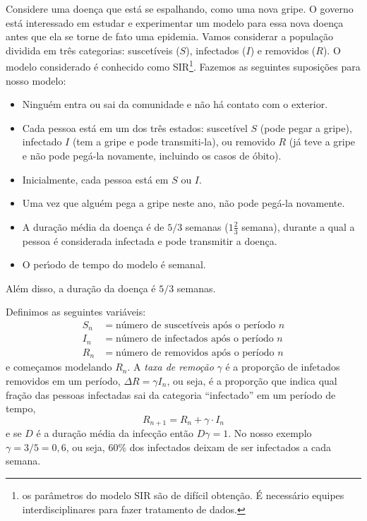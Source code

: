 \documentclass{article}
\begin{document}
Considere uma doen\c{c}a que est\'a se espalhando, como uma nova
gripe. O governo est\'a interessado em estudar e experimentar um modelo
para essa nova doen\c{c}a antes que ela se torne de fato uma
epidemia. Vamos considerar a popula\c{c}\~ao dividida em tr\^es
categorias: suscet\'iveis ($S$), infectados ($I$) e removidos ($R$).  O
modelo considerado \'{e} conhecido como SIR\footnote{os parâmetros do
  modelo SIR são de difícil obtenção. É necessário equipes
  interdisciplinares para fazer tratamento de dados.}. Fazemos as
seguintes suposi\c{c}\~oes para nosso modelo:
\begin{itemize}
\item Ningu\'em entra ou sai da comunidade e n\~ao h\'a contato com o
  exterior.
\item Cada pessoa est\'a em um dos tr\^es estados: suscet\'ivel $S$
  (pode pegar a gripe), infectado $I$ (tem a gripe e pode
  transmiti-la), ou removido $R$ (j\'a teve a gripe e n\~ao pode
  peg\'a-la novamente, incluindo os casos de \'obito).
\item Inicialmente, cada pessoa est\'a em $S$ ou $I$.
\item Uma vez que algu\'em pega a gripe neste ano, n\~ao pode peg\'a-la
  novamente.
\item A dura\c{c}\~ao m\'edia da doen\c{c}a \'e de $5/3$ semanas
  ($1\tfrac 23$ semana), durante a qual a pessoa \'{e}
  considerada infectada e pode transmitir a doen\c{c}a.
\item O per\'{\i}odo de tempo do modelo \'{e} semanal.
\end{itemize}
Além disso, a dura\c{c}\~ao da doen\c{c}a \'{e} $5/3$ semanas.

Definimos as seguintes vari\'{a}veis:
\begin{align*}
  S_n &= \text{n\'umero de suscet\'iveis ap\'os o per\'iodo } n \\
  I_n &= \text{n\'umero de infectados ap\'os o per\'iodo } n \\
  R_n &= \text{n\'umero de removidos ap\'os o per\'iodo } n
\end{align*}
e come\c{c}amos modelando $R_n$. A \emph{taxa de remoção} $\gamma$ é a
proporção de infetados removidos em um período,
$ \Delta R = \gamma I_n$, ou seja, é a proporção que indica qual fração
das pessoas infectadas sai da categoria ``infectado'' em um período de
tempo,
\[
  R_{n+1} = R_n + \gamma \cdot I_n
\]
e se $D$ é a duração média da infecção então $D\gamma =1$. No nosso
exemplo $\gamma =3/5 = 0{,}6$, ou seja, 60\% dos infectados deixam de
ser infectados a cada semana. 
\end{document}
